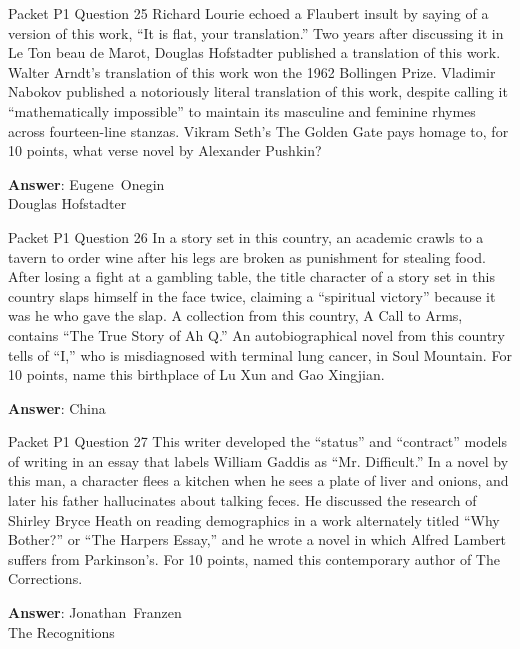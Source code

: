 \begin{frame}{Packet P1 Question 25}
Richard Lourie echoed a Flaubert insult by saying of a version of this work, ``It is flat, your translation.'' Two years after discussing it in Le Ton beau de Marot, Douglas Hofstadter   published a translation of this work. Walter Arndt's translation of this work won the 1962 Bollingen Prize. Vladimir Nabokov published a notoriously literal translation of this work, despite calling it ``mathematically impossible'' to maintain its masculine and feminine rhymes across       fourteen-line stanzas. Vikram Seth's The Golden Gate pays homage to, for 10 points, what verse novel   by Alexander Pushkin?

\textbf{Answer}: Eugene\ Onegin\\
 Douglas Hofstadter
\end{frame}

\begin{frame}{Packet P1 Question 26}
In a story set in this country, an academic crawls to a tavern to order wine after his legs are broken as punishment for stealing food. After losing a fight at a gambling table, the title character of a story set in this country slaps himself in the face twice, claiming a ``spiritual victory'' because it was he who gave the slap. A collection from this country, A Call to Arms, contains ``The True Story of Ah Q.'' An autobiographical     novel from this country tells   of ``I,'' who is misdiagnosed with terminal lung cancer, in Soul Mountain. For 10   points, name this birthplace of Lu Xun and Gao Xingjian.

\textbf{Answer}: China\\
\end{frame}

\begin{frame}{Packet P1 Question 27}
This writer developed the ``status'' and ``contract'' models of writing in an essay that labels William Gaddis as ``Mr. Difficult.'' In a novel by this man, a character flees a kitchen when he sees a plate of liver and onions, and later his father hallucinates about talking feces. He discussed the research   of Shirley Bryce Heath on reading demographics in a work alternately titled ``Why Bother?'' or ``The Harpers   Essay,'' and he wrote a novel in which Alfred Lambert suffers     from Parkinson's. For 10 points, named this contemporary   author of The Corrections.

\textbf{Answer}: Jonathan\ Franzen\\
 The Recognitions
\end{frame}

